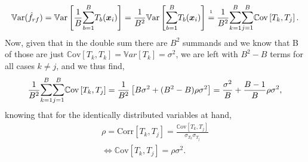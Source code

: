 \documentclass[a4paper,12pt, headsepline]{scrartcl}
\numberwithin{equation}{section}
\begin{document}
\begin{align*}
 \mathbb{V}\text{ar}(\hat f_{rf}) = \mathbb{V}\text{ar} \left[ \frac{1}{B} \mathlarger{\sum}\limits_{b = 1}^B T_b(\bm x_i) \right] = \frac{1}{B^2} \mathbb{V}\text{ar} \left[ \mathlarger{\sum}\limits_{b = 1}^B T_b(\bm x_i) \right] \overset{\text{\footnotemark}}{=} \frac{1}{B^2} \mathlarger{\sum}\limits_{k = 1}^B \mathlarger{\sum}\limits_{j = 1}^B \mathbb{C}\text{ov} \left[T_k, T_j \right].
\end{align*}
Now, given that in the double sum there are $B^2$ summands and we know that B of those are just $\mathbb{C}\text{ov}\left[T_k, T_k \right] = \mathbb{V}ar\left[T_k\right] = \sigma^2$, we are left with $B^2 - B$ terms for all cases $k \neq j$, and we thus find,
\[
\frac{1}{B^2} \mathlarger{\sum}\limits_{k = 1}^B \mathlarger{\sum}\limits_{j = 1}^B \mathbb{C}\text{ov} \left[T_k, T_j \right] = \frac{1}{B^2} \left[B\sigma^2 + (B^2 - B)\rho\sigma^2 \right] = \frac{\sigma^2}{B} +  \frac{B - 1}{B}\rho\sigma^2,
\]
knowing that for the identically distributed variables at hand,
\begin{gather*}
	\rho = \text{Corr}\left[T_k, T_j\right] =  \frac{\mathbb{C}\text{ov}\left[T_k, T_j \right]}{\sigma_{T_k}\sigma_{T_j}}\\
	\iff \mathbb{C}\text{ov}\left[T_k, T_j \right] = \rho\sigma^2.
\end{gather*}
\end{document}
